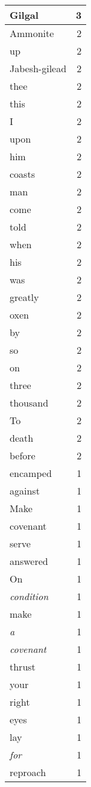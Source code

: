 \begin{center}
\begin{longtable}{l|r}
Gilgal & 3 \\ \hline
Ammonite & 2 \\ \hline
up & 2 \\ \hline
Jabesh-gilead & 2 \\ \hline
thee & 2 \\ \hline
this & 2 \\ \hline
I & 2 \\ \hline
upon & 2 \\ \hline
him & 2 \\ \hline
coasts & 2 \\ \hline
man & 2 \\ \hline
come & 2 \\ \hline
told & 2 \\ \hline
when & 2 \\ \hline
his & 2 \\ \hline
was & 2 \\ \hline
greatly & 2 \\ \hline
oxen & 2 \\ \hline
by & 2 \\ \hline
so & 2 \\ \hline
on & 2 \\ \hline
three & 2 \\ \hline
thousand & 2 \\ \hline
To & 2 \\ \hline
death & 2 \\ \hline
before & 2 \\ \hline
encamped & 1 \\ \hline
against & 1 \\ \hline
Make & 1 \\ \hline
covenant & 1 \\ \hline
serve & 1 \\ \hline
answered & 1 \\ \hline
On & 1 \\ \hline
\emph{condition} & 1 \\ \hline
make & 1 \\ \hline
\emph{a} & 1 \\ \hline
\emph{covenant} & 1 \\ \hline
thrust & 1 \\ \hline
your & 1 \\ \hline
right & 1 \\ \hline
eyes & 1 \\ \hline
lay & 1 \\ \hline
\emph{for} & 1 \\ \hline
reproach & 1 \\ \hline

\end{longtable}
\end{center}

